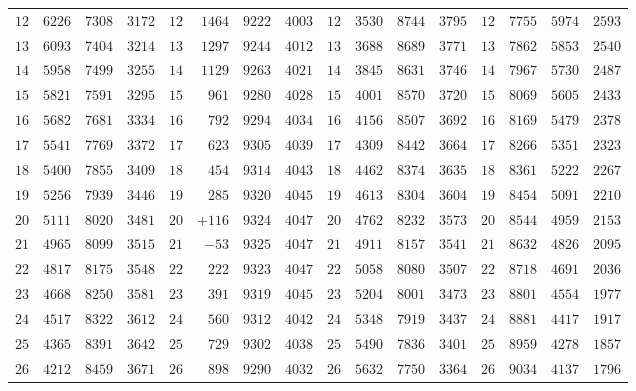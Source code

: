 \begin{center}
\begin{tabular}{r|r|r|r||r|r|r|r||r|r|r|r||r|r|r|r}
$12$ & $6226$ & $7308$ & $3172$ & $12$ & $1464$ & $9222$ & $4003$ & $12$ & $3530$ & $8744$ & $3795$ & $12$ & $7755$ & $5974$ & $2593$\\
$13$ & $6093$ & $7404$ & $3214$ & $13$ & $1297$ & $9244$ & $4012$ & $13$ & $3688$ & $8689$ & $3771$ & $13$ & $7862$ & $5853$ & $2540$\\
$14$ & $5958$ & $7499$ & $3255$ & $14$ & $1129$ & $9263$ & $4021$ & $14$ & $3845$ & $8631$ & $3746$ & $14$ & $7967$ & $5730$ & $2487$\\
$15$ & $5821$ & $7591$ & $3295$ & $15$ & $961$ & $9280$ & $4028$ & $15$ & $4001$ & $8570$ & $3720$ & $15$ & $8069$ & $5605$ & $2433$\\[3pt]
$16$ & $5682$ & $7681$ & $3334$ & $16$ & $792$ & $9294$ & $4034$ & $16$ & $4156$ & $8507$ & $3692$ & $16$ & $8169$ & $5479$ & $2378$\\
$17$ & $5541$ & $7769$ & $3372$ & $17$ & $623$ & $9305$ & $4039$ & $17$ & $4309$ & $8442$ & $3664$ & $17$ & $8266$ & $5351$ & $2323$\\
$18$ & $5400$ & $7855$ & $3409$ & $18$ & $454$ & $9314$ & $4043$ & $18$ & $4462$ & $8374$ & $3635$ & $18$ & $8361$ & $5222$ & $2267$\\
$19$ & $5256$ & $7939$ & $3446$ & $19$ & $285$ & $9320$ & $4045$ & $19$ & $4613$ & $8304$ & $3604$ & $19$ & $8454$ & $5091$ & $2210$\\
$20$ & $5111$ & $8020$ & $3481$ & $20$ & $+116$ & $9324$ & $4047$ & $20$ & $4762$ & $8232$ & $3573$ & $20$ & $8544$ & $4959$ & $2153$\\[3pt]
$21$ & $4965$ & $8099$ & $3515$ & $21$ & $-53$ & $9325$ & $4047$ & $21$ & $4911$ & $8157$ & $3541$ & $21$ & $8632$ & $4826$ & $2095$\\
$22$ & $4817$ & $8175$ & $3548$ & $22$ & $222$ & $9323$ & $4047$ & $22$ & $5058$ & $8080$ & $3507$ & $22$ & $8718$ & $4691$ & $2036$\\
$23$ & $4668$ & $8250$ & $3581$ & $23$ & $391$ & $9319$ & $4045$ & $23$ & $5204$ & $8001$ & $3473$ & $23$ & $8801$ & $4554$ & $1977$\\
$24$ & $4517$ & $8322$ & $3612$ & $24$ & $560$ & $9312$ & $4042$ & $24$ & $5348$ & $7919$ & $3437$ & $24$ & $8881$ & $4417$ & $1917$\\
$25$ & $4365$ & $8391$ & $3642$ & $25$ & $729$ & $9302$ & $4038$ & $25$ & $5490$ & $7836$ & $3401$ & $25$ & $8959$ & $4278$ & $1857$\\[3pt]
$26$ & $4212$ & $8459$ & $3671$ & $26$ & $898$ & $9290$ & $4032$ & $26$ & $5632$ & $7750$ & $3364$ & $26$ & $9034$ & $4137$ & $1796$\\

\end{tabular}
\end{center}
